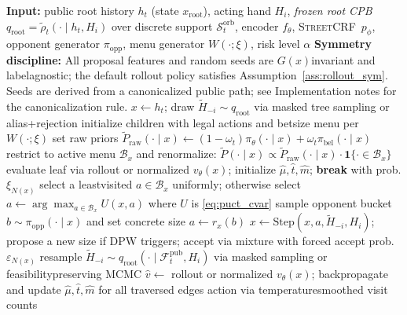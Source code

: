 \documentclass[10pt]{article}
\newcommand{\sCRF}{\textsc{Street\textendash CRF}\xspace}
\newcommand{\1}{\mathbf{1}}
\theoremstyle{plain}
\begin{document}
\begin{algorithm}[t]
\caption{IS\textendash RS Belief\textendash MCTS\textendash \sCRF\ (selection $\to$ expansion $\to$ evaluation)}
\label{alg:bmcrf}
\begin{adjustbox}{width=\linewidth}
\begin{minipage}{\linewidth}
\begin{algorithmic}[1]
\State \textbf{Input:} public root history $h_t$ (state $x_{\mathrm{root}}$), acting hand $H_i$, \emph{frozen root CPB} $q_{\mathrm{root}}=\tilde\rho_t(\cdot\mid h_t,H_i)$ over discrete support $\mathcal{S}_t^{\text{orb}}$, encoder $f_\theta$, \sCRF\ $p_\phi$, opponent generator $\pi_{\mathrm{opp}}$, menu generator $W(\cdot;\xi)$, risk level $\alpha$
\State \textbf{Symmetry discipline:} All proposal features and random seeds are $G(x)$\textendash invariant and label\textendash agnostic; the default rollout policy satisfies Assumption~\ref{ass:rollout_sym}. Seeds are derived from a canonicalized public path; see Implementation notes for the canonicalization rule.
  \State $x \gets h_t$;\; draw $\tilde H_{-i}\sim q_{\mathrm{root}}$ via masked tree sampling or alias+rejection
      \State initialize children with legal actions and bet\textendash size menu per $W(\cdot;\xi)$
      \State set raw priors $\tilde P_{\text{raw}}(\cdot\mid x)\!\leftarrow\!(1-\omega_t)\pi_\theta(\cdot\mid x)+\omega_t \pi_{\text{bel}}(\cdot\mid x)$
      \State restrict to active menu $\mathcal{B}_x$ and renormalize: $\tilde P(\cdot\mid x)\propto \tilde P_{\text{raw}}(\cdot\mid x)\cdot \1\{\cdot\in\mathcal{B}_x\}$
      \State evaluate leaf via rollout or normalized $v_\theta(x)$; initialize $\hat\mu,\widehat t,\widehat m$; \textbf{break}
    \Else
        \State with prob. $\xi_{N(x)}$ select a least\textendash visited $a\in\mathcal{B}_x$ uniformly; otherwise select $a \leftarrow \arg\max_{a\in\mathcal{B}_x} U(x,a)$ where $U$ is \eqref{eq:puct_cvar}
      \Else
        \State sample opponent bucket $b \sim \pi_{\mathrm{opp}}(\cdot\mid x)$ and set concrete size $a\gets r_x(b)$
      \EndIf
      \State $x \leftarrow \text{Step}(x,a,\tilde H_{-i},H_i)$; propose a new size if DPW triggers; accept via mixture with forced accept prob.\ $\varepsilon_{N(x)}$
         \State resample $\tilde H_{-i}\sim q_{\mathrm{root}}(\cdot\mid \mathcal{F}^{\mathrm{pub}}_t,H_i)$ via masked sampling or feasibility\textendash preserving MCMC
      \EndIf
    \EndIf
  \EndWhile
  \State $\hat v \leftarrow$ rollout or normalized $v_\theta(x)$; backpropagate and update $\hat\mu,\widehat t,\widehat m$ for all traversed edges
\EndFor
\State \Return action via temperature\textendash smoothed visit counts
\end{algorithmic}
\end{minipage}
\end{adjustbox}
\end{algorithm}
\end{document}
